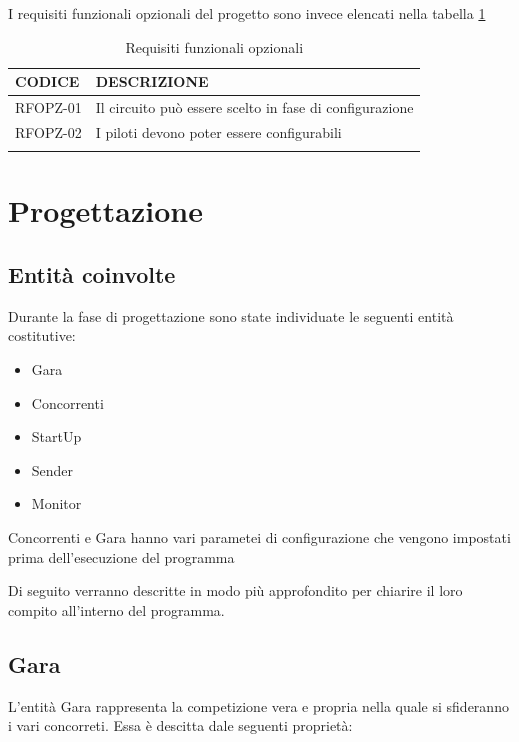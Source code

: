 \documentclass[a4paper,11pt, twoside]{book}
\begin{document}
    I requisiti funzionali opzionali del progetto sono invece elencati nella tabella \ref{tbl:RequisitiFunzionaliOpzionali}
    
    \begin{longtable}{|p{2cm}|p{8cm}|}
      \toprule
	\bfseries{CODICE} & \bfseries{DESCRIZIONE} \\\hline
      \endfirsthead
      RFOPZ-01 & Il circuito può essere scelto in fase di configurazione \\\cline{1-2}
      RFOPZ-02 & I piloti devono poter essere configurabili \\\cline{1-2}
      \caption{Requisiti funzionali opzionali}
      \label{tbl:RequisitiFunzionaliOpzionali}
    \end{longtable}
    
  
  \chapter{Progettazione}
    \section{Entità coinvolte}
      Durante la fase di progettazione sono state individuate le seguenti entità costitutive:
      
      \begin{itemize}
        
	\item Gara 
	\item Concorrenti
	\item StartUp
	\item Sender
	\item Monitor

      \end{itemize}
      
      
      Concorrenti e Gara hanno vari parametei di configurazione che vengono impostati prima 
      dell'esecuzione del programma
      
      Di seguito verranno descritte in modo più approfondito per chiarire il loro compito all'interno del
      programma.
      
    \section{Gara}
      L'entità Gara rappresenta la competizione vera e propria nella quale si sfideranno i vari
      concorreti. Essa è descitta dale seguenti proprietà:
      
\end{document}
